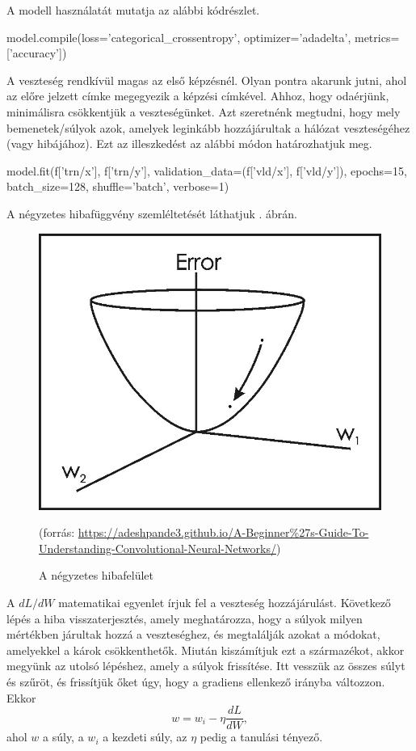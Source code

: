 A modell használatát mutatja az alábbi kódrészlet.
\begin{python}
model.compile(loss='categorical_crossentropy',
              optimizer='adadelta',
              metrics=['accuracy'])
\end{python}

A veszteség rendkívül magas az első képzésnél. Olyan pontra akarunk jutni, ahol az előre jelzett címke megegyezik a képzési címkével. Ahhoz, hogy odaérjünk, minimálisra csökkentjük a veszteségünket. Azt szeretnénk megtudni, hogy mely bemenetek/súlyok azok, amelyek leginkább hozzájárultak a hálózat veszteségéhez (vagy hibájához). Ezt az illeszkedést az alábbi módon határozhatjuk meg.

\begin{python}
model.fit(f['trn/x'], f['trn/y'],	
	validation_data=(f['vld/x'], f['vld/y']),
	epochs=15, batch_size=128,
	shuffle='batch', verbose=1)
\end{python}

A négyzetes hibafüggvény szemléltetését láthatjuk . ábrán.

\begin{figure}[h]
\centering
\includegraphics[scale=0.4]{images/CNN_loss}
\caption{A négyzetes hibafelület}
(forrás: \url{https://adeshpande3.github.io/A-Beginner%27s-Guide-To-Understanding-Convolutional-Neural-Networks/})
\label{fig:CNN_loss}
\end{figure}

A $dL/dW$ matematikai egyenlet írjuk fel a veszteség hozzájárulást. Következő lépés a hiba visszaterjesztés, amely meghatározza, hogy a súlyok milyen mértékben járultak hozzá a veszteséghez, és megtalálják azokat a módokat, amelyekkel a károk csökkenthetők. Miután kiszámítjuk ezt a származékot, akkor megyünk az utolsó lépéshez, amely a súlyok frissítése. Itt vesszük az összes súlyt és szűröt, és frissítjük őket úgy, hogy a gradiens ellenkező irányba változzon. Ekkor
$$
w = w_i - \eta \dfrac{dL}{dW},
$$
ahol $w$ a súly, a $w_i$ a kezdeti súly, az $\eta$ pedig a tanulási tényező.

